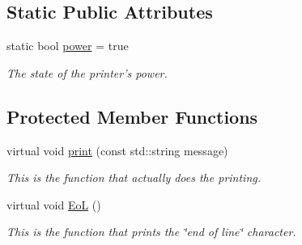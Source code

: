 \subsection*{Static Public Attributes}
\begin{DoxyCompactItemize}
\item 
static bool \hyperlink{classJKBuilder_1_1IOManager_aababa9aef0d20ddcfce2d78f41ae1dd8}{power} = true
\begin{DoxyCompactList}\small\item\em The state of the printer's power. \item\end{DoxyCompactList}\end{DoxyCompactItemize}
\subsection*{Protected Member Functions}
\begin{DoxyCompactItemize}
\item 
virtual void \hyperlink{classJKBuilder_1_1IOManager_a3abc9519dd5220ecb1154daa25f557fe}{print} (const std::string message)
\begin{DoxyCompactList}\small\item\em This is the function that actually does the printing. \item\end{DoxyCompactList}\item 
virtual void \hyperlink{classJKBuilder_1_1IOManager_a7f207ac705d33a0cd9794a9f0b4a1fa0}{EoL} ()
\begin{DoxyCompactList}\small\item\em This is the function that prints the \char`\"{}end of line\char`\"{} character. \item\end{DoxyCompactList}\end{DoxyCompactItemize}

